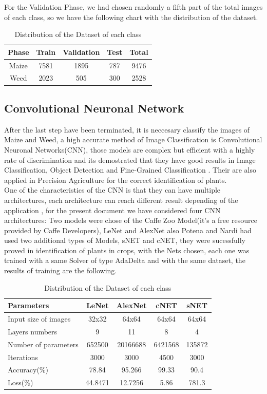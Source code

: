 \documentclass[conference]{IEEEtran}
\begin{document}
For the Validation Phase, we had chosen randomly a fifth part of the total images of each class, so we have the following chart with the distribution of the dataset.

\begin{table}[h!]
\centering
\begin{tabular}{| c | c | c | c | c |} 
 \hline
 Phase & Train & Validation & Test & Total \\ [1ex] 
 \hline
 Maize & 7581 & 1895 & 787 & 9476 \\ 
 Weed & 2023 & 505 & 300 & 2528\\ 
 \hline
\end{tabular}
\caption{Distribution of the Dataset of each class}
\label{table:1}
\end{table}
	
	
\subsection{Convolutional Neuronal Network}
	After the last step have been terminated, it is neccesary classify the images of Maize and Weed, a high accurate method of Image Classification is Convolutional Neuronal Networks(CNN), those models are complex but efficient with a highly rate of discrimination and its demostrated that they have good results in Image Classification, Object Detection and Fine-Grained  Classification \cite{Razavian}. Their are also applied in Precision Agriculture \cite{Potena:Nardi} for the correct identification of plants.
\\ 

One of the characteristics of the CNN is that they can have multiple architectures, each architecture can reach different result depending of the application , for the present document we have considered four CNN architectures: Two models were chose of the Caffe Zoo Model(it's a free resource provided by Caffe Developers), LeNet and AlexNet also Potena and Nardi had used two additional types of Models, sNET and cNET, they were sucessfully proved in identification of plants in crops\cite{Potena:Nardi}, with the Nets chosen, each one was trained with a same Solver of type AdaDelta and with the same dataset, the results of training are the following. \\
\begin{table}[h!]
\centering
\begin{tabular}{|l c c c c|} 
 \hline
 Parameters & LeNet & AlexNet & cNET & sNET \\ [0.75ex] 
 \hline
 Input size of images & 32x32 & 64x64 & 64x64 & 64x64 \\ 
 Layers numbers & 9 & 11 & 8 & 4\\
 Number of parameters & 652500 & 20166688 & 6421568 & 135872 \\ 
 Iterations & 3000 & 3000 & 4500 & 3000 \\ 
  Accuracy(\%) & 78.84 & 95.266 & 99.33 & 90.4 \\
  Loss(\%) & 44.8471 & 12.7256 & 5.86 & 781.3 \\ [1ex] 
 \hline 
\end{tabular}
\caption{Distribution of the Dataset of each class}
\label{table:2}
\end{table}
	
\end{document}
